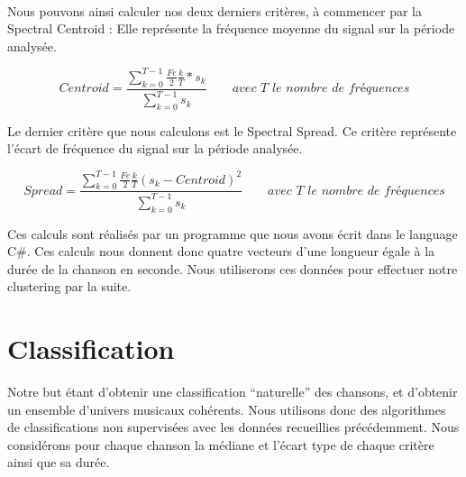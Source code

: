\documentclass[soumission]{ir}
\begin{document}
\paragraph{}
Nous pouvons ainsi calculer nos deux derniers critères, à commencer par la Spectral Centroid : Elle représente la 
fréquence moyenne du signal sur la période analysée.

\begin{equation}
    Centroid = \frac{ \sum_{k = 0}^{T-1} \frac{Fe}{2} \frac{k}{T} * s_k}{\sum_{k=0}^{T-1} s_k}
    \qquad \textit{avec T le nombre de fréquences}
\end{equation}

Le dernier critère que nous calculons est le Spectral Spread. Ce critère représente l'écart de fréquence du
signal sur la période analysée.

\begin{equation}
    Spread = \frac{ \sum_{k = 0}^{T-1} \frac{Fe}{2} \frac{k}{T} (s_k - Centroid)^2}{\sum_{k=0}^{T-1} s_k}
    \qquad \textit{avec T le nombre de fréquences}
\end{equation}

Ces calculs sont réalisés par un programme que nous avons écrit dans le language C\#. Ces calculs nous donnent 
donc quatre vecteurs d’une longueur égale à la durée de la chanson en seconde. Nous utiliserons ces données 
pour effectuer notre clustering par la suite.

\section{Classification}
Notre but étant d’obtenir une classification “naturelle” des chansons, et d’obtenir un ensemble d’univers 
musicaux cohérents. Nous utilisons donc des algorithmes de classifications non supervisées avec les données 
recueillies précédemment. Nous considérons pour chaque chanson la médiane et l’écart type de chaque critère
ainsi que sa durée.
\end{document}
